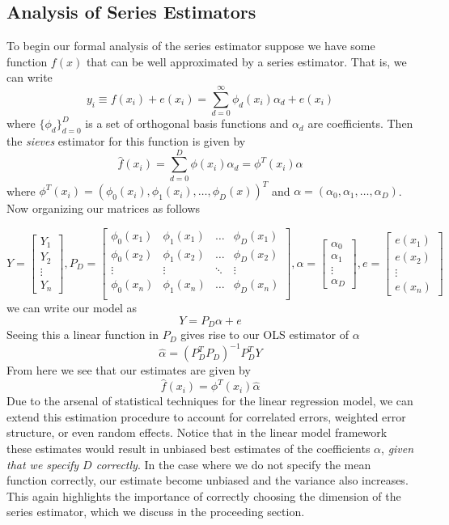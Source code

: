 \documentclass[12pt]{article}  %
\begin{document}
\subsection{Analysis of Series Estimators}

To begin our formal analysis of the series estimator suppose we have some function $f(x)$ that can be well approximated by a series estimator. That is, we can write $$y_i\equiv f(x_i) + e(x_i)= \sum_{d=0}^{\infty}\phi_{d}(x_i)\alpha_d + e(x_i)$$
where $\{\phi_d\}_{d=0}^{D}$ is a set of orthogonal basis functions and $\alpha_d$ are coefficients. Then the \textit{sieves} estimator for this function is given by $$\hat{f}(x_i) = \sum_{d=0}^{D}\phi(x_i)\alpha_{d} = \phi^{T}(x_i)\alpha$$where $\phi^{T}(x_i) = (\phi_{0}(x_i), \phi_{1}(x_i),\ldots, \phi_D(x))^{T}$ and $\alpha = (\alpha_0, \alpha_1, \ldots, \alpha_D)$. Now organizing our matrices as follows 

$$Y = \begin{bmatrix}Y_1\\ Y_2\\\vdots\\Y_n\end{bmatrix}, P_D = \begin{bmatrix}\phi_0(x_1) & \phi_1(x_1) & \ldots & \phi_{D}(x_1)\\\phi_0(x_2) & \phi_1(x_2) & \ldots & \phi_{D}(x_2)\\\vdots & \vdots & \ddots & \vdots \\\phi_0(x_n) & \phi_1(x_n) & \ldots & \phi_{D}(x_n)\\\end{bmatrix}, \alpha = \begin{bmatrix}\alpha_0\\\alpha_1 \\\vdots\\\alpha_D\end{bmatrix}, e =\begin{bmatrix}e(x_1)\\e(x_2)\\\vdots\\e(x_n)\end{bmatrix}$$ we can write our model as $$Y = P_D\alpha + e$$
Seeing this a linear function in $P_D$ gives rise to our OLS estimator of $\alpha$ $$\hat{\alpha} = (P_D^{T}P_D)^{-1}P_D^{T}Y$$ From here we see that our estimates are given by $$\hat{f}(x_i) = \phi^{T}(x_i)\hat{\alpha}$$
Due to the arsenal of statistical techniques for the linear regression model, we can extend this estimation procedure to account for correlated errors, weighted error structure, or even random effects. Notice that in the linear model framework these estimates would result in unbiased best estimates of the coefficients $\alpha$, \textit{given that we specify $D$ correctly}. In the case where we do not specify the mean function correctly, our estimate become unbiased and the variance also increases. This again highlights the importance of correctly choosing the dimension of the series estimator, which we discuss in the proceeding section. 
\end{document}
